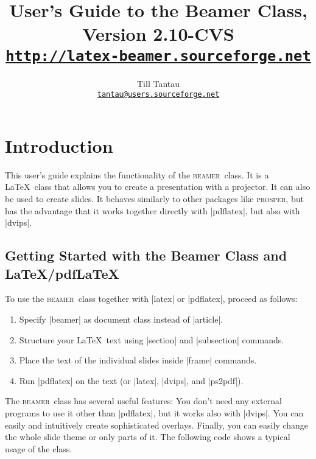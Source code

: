 \documentclass{ltxdoc}
\def\beamer{\textsc{beamer}}
\begin{document}
\title{User's Guide to the Beamer Class, Version 2.10-CVS\\
\Large\href{http://latex-beamer.sourceforge.net}{\texttt{http://latex-beamer.sourceforge.net}}}
\author{Till Tantau\\
  \href{mailto:tantau@users.sourceforge.net}{\texttt{tantau@users.sourceforge.net}}}

\maketitle

\tableofcontents

\section{Introduction}

This user's guide explains the functionality of the \beamer\ class.
It is a \LaTeX\ class that allows you to create a presentation with a
projector. It can also be used to create slides. It behaves 
similarly to other packages like \textsc{prosper}, but has the
advantage that it works together directly with |pdflatex|, but
also with |dvips|.

\subsection{Getting Started with the Beamer Class and \LaTeX/pdf\LaTeX}

To use the \beamer\ class together with |latex| or |pdflatex|, proceed
as follows: 
\begin{enumerate}
\item
  Specify |beamer| as document class instead of
  |article|.
\item
  Structure your \LaTeX\ text using |section| and
  |subsection| commands.
\item
  Place the text of the individual slides inside |frame|
  commands.
\item
  Run |pdflatex| on the text (or |latex|,
  |dvips|, and |ps2pdf|).
\end{enumerate}

The \beamer\ class has several useful features: You don't need any
external programs to use it other than |pdflatex|, but it works
also with |dvips|. You can easily and intuitively create
sophisticated overlays. Finally, you can easily change the whole slide
theme or only parts of it. The following code shows a typical usage of
the class.
\end{document}
